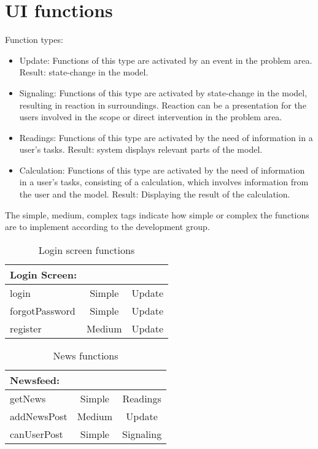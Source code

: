 \section{UI functions}

Function types:
\begin{itemize}
\item{Update: Functions of this type are activated by an event in the problem area. Result: state-change in the model.}

\item{Signaling: Functions of this type are activated by state-change in the model, resulting in reaction in surroundings. Reaction can be a presentation for the users involved in the scope or direct intervention in the problem area.}

\item{Readings: Functions of this type are activated by the need of information in a user's tasks. Result: system displays relevant parts of the model.}

\item{Calculation: Functions of this type are activated by the need of information in a user's tasks, consisting of a calculation, which involves information from the user and the model. Result: Displaying the result of the calculation.}

\end{itemize}

The simple, medium, complex tags indicate how simple or complex the functions are to implement according to the development group.

\begin{table}[!ht]
\centering
\begin{tabular}{ l  c  c }

Login Screen: &  & \\ \hline
login & Simple & Update \\ \hline
forgotPassword & Simple & Update \\ \hline
register & Medium & Update \\ \hline
\end{tabular}
\caption{Login screen functions}
\label{tbl:loginscreen}
\end{table}

\begin{table}[!ht]
\centering
\begin{tabular}{ l  c  c }

Newsfeed: & & \\ \hline
getNews & Simple & Readings \\ \hline
addNewsPost & Medium & Update \\ \hline
canUserPost & Simple & Signaling \\ \hline

\end{tabular}
\caption{News functions}
\label{tbl:newsfeed}
\end{table}

